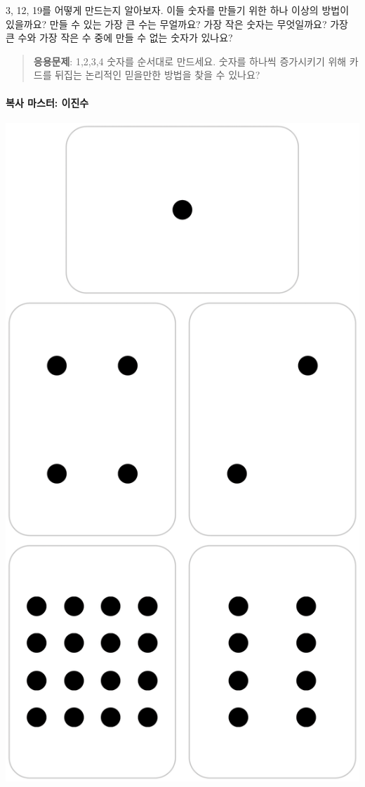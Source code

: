 \documentclass[]{article}
\begin{document}
3, 12, 19를 어떻게 만드는지 알아보자. 이들 숫자를 만들기 위한 하나
이상의 방법이 있을까요? 만들 수 있는 가장 큰 수는 무얼까요? 가장 작은
숫자는 무엇일까요? 가장 큰 수와 가장 작은 수 중에 만들 수 없는 숫자가
있나요?

\begin{quote}
\textbf{응용문제}: 1,2,3,4 숫자를 순서대로 만드세요. 숫자를 하나씩
증가시키기 위해 카드를 뒤집는 논리적인 믿을만한 방법을 찾을 수 있나요?
\end{quote}

\mbox{}\paragraph{복사 마스터: 이진수}\label{section-12}

\includegraphics{csunplugged/01-part/img/ch01-binary/01-binary-04-photocopy-master.png}
\end{document}
